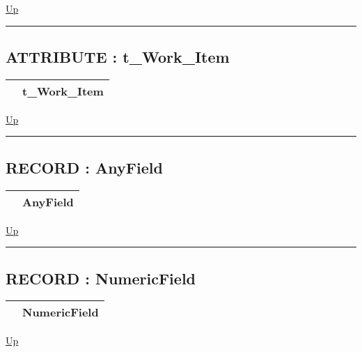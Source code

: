 \hyperlink{ecldoc:ML_Core.Types}{Up}

\par


\rule{\textwidth}{0.4pt}
\subsection*{ATTRIBUTE : t\_Work\_Item}
\hypertarget{ecldoc:ml_core.types.t_work_item}{}

{\renewcommand{\arraystretch}{1.5}
\begin{tabularx}{\textwidth}{|>{\raggedright\arraybackslash}l|X|}
\hline
\hspace{0pt} & t\_Work\_Item \\
\hline
\end{tabularx}
}

\hyperlink{ecldoc:ML_Core.Types}{Up}

\par


\rule{\textwidth}{0.4pt}
\subsection*{RECORD : AnyField}
\hypertarget{ecldoc:ml_core.types.anyfield}{}

{\renewcommand{\arraystretch}{1.5}
\begin{tabularx}{\textwidth}{|>{\raggedright\arraybackslash}l|X|}
\hline
\hspace{0pt} & AnyField \\
\hline
\end{tabularx}
}

\hyperlink{ecldoc:ML_Core.Types}{Up}

\par


\rule{\textwidth}{0.4pt}
\subsection*{RECORD : NumericField}
\hypertarget{ecldoc:ml_core.types.numericfield}{}

{\renewcommand{\arraystretch}{1.5}
\begin{tabularx}{\textwidth}{|>{\raggedright\arraybackslash}l|X|}
\hline
\hspace{0pt} & NumericField \\
\hline
\end{tabularx}
}

\hyperlink{ecldoc:ML_Core.Types}{Up}

\par


